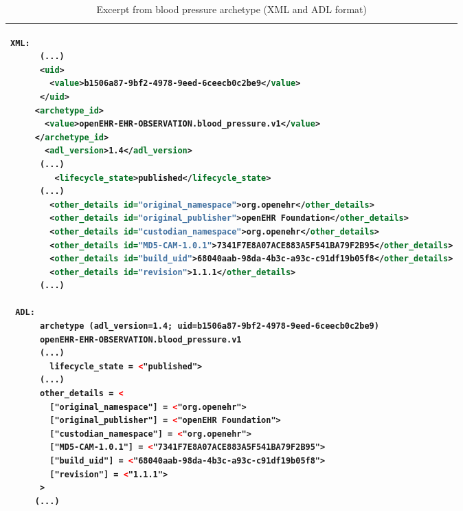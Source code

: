 \documentclass[mim_thesis.tex]{subfiles}
\begin{document}
\begin{table}[H]
\caption{Excerpt from blood pressure archetype (XML and ADL format)}
\label{tab:bp_xml_adl}
\begin{tabular}{l}
\toprule[2pt]
\begin{lstlisting}[language=XML]
XML:    
      (...)
      <uid>
        <value>b1506a87-9bf2-4978-9eed-6ceecb0c2be9</value>
      </uid>
     <archetype_id>
       <value>openEHR-EHR-OBSERVATION.blood_pressure.v1</value>
     </archetype_id>
       <adl_version>1.4</adl_version>
      (...)
         <lifecycle_state>published</lifecycle_state>
      (...)
        <other_details id="original_namespace">org.openehr</other_details>
        <other_details id="original_publisher">openEHR Foundation</other_details>
        <other_details id="custodian_namespace">org.openehr</other_details>
        <other_details id="MD5-CAM-1.0.1">7341F7E8A07ACE883A5F541BA79F2B95</other_details>
        <other_details id="build_uid">68040aab-98da-4b3c-a93c-c91df19b05f8</other_details>
        <other_details id="revision">1.1.1</other_details>
      (...)

 ADL:
      archetype (adl_version=1.4; uid=b1506a87-9bf2-4978-9eed-6ceecb0c2be9)
      openEHR-EHR-OBSERVATION.blood_pressure.v1
      (...)
      	lifecycle_state = <"published">
      (...)	
      other_details = <
      	["original_namespace"] = <"org.openehr">
      	["original_publisher"] = <"openEHR Foundation">
      	["custodian_namespace"] = <"org.openehr">
      	["MD5-CAM-1.0.1"] = <"7341F7E8A07ACE883A5F541BA79F2B95">
      	["build_uid"] = <"68040aab-98da-4b3c-a93c-c91df19b05f8">
      	["revision"] = <"1.1.1">
      >
     (...)

\end{lstlisting}
\tabularnewline \bottomrule[2pt]
\end{tabular}
\end{table}
\end{document}
